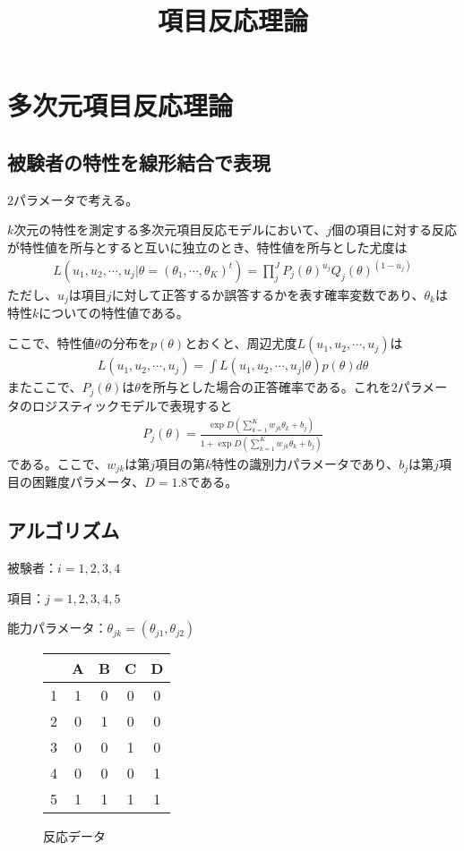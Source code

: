 \documentclass[20pt]{jarticle}
\title{項目反応理論}
\begin{document}
\maketitle
\section{多次元項目反応理論}
\subsection{被験者の特性を線形結合で表現}
$2$パラメータで考える。

$k$次元の特性を測定する多次元項目反応モデルにおいて、$j$個の項目に対する反応が特性値を所与とすると互いに独立のとき、特性値を所与とした尤度は
\begin{align}
  \label{01}
  \displaystyle
    L(u_1,u_2,\cdots,u_j|\theta = (\theta_1,\cdots,\theta_K)^{t})=\prod_j^J P_j(\theta)^{u_j} Q_j(\theta)^{(1 - u_j)}
  \tag{1}
\end{align}
ただし、$u_j$は項目$j$に対して正答するか誤答するかを表す確率変数であり、$\theta_k$は特性$k$についての特性値である。

ここで、特性値$\theta$の分布を$p(\theta)$とおくと、周辺尤度$L(u_1,u_2,\cdots,u_j)$は
\begin{align}
  \label{02}
  \displaystyle
    L(u_1,u_2,\cdots,u_j) = \int L(u_1,u_2,\cdots,u_j|\theta)p(\theta) d \theta
  \tag{2}
\end{align}
またここで、$P_j(\theta)$は$\theta$を所与とした場合の正答確率である。これを$2$パラメータのロジスティックモデルで表現すると
\begin{align}
  \label{03}
  \displaystyle
    P_j(\theta) = \frac{\exp D (\sum\limits_{k = 1}^{K} w_{jk} \theta_k + b_j)}{1 + \exp D (\sum\limits_{k = 1}^{K} w_{jk} \theta_k + b_j)}
  \tag{3}
\end{align}である。ここで、$w_{jk}$は第$j$項目の第$k$特性の識別力パラメータであり、$b_j$は第$j$項目の困難度パラメータ、$D=1.8$である。

\subsection{アルゴリズム}
被験者：$i = 1,2,3,4$

項目：$j = 1,2,3,4,5$

能力パラメータ：$\theta_{jk}=(\theta_{j1},\theta_{j2})$
\begin{figure}[H]
  \centering
  \begin{tabular}{|c|c|c|c|c|} \hline
     & A & B & C & D \\ \hline
    1 & 1 & 0 & 0 & 0 \\ \hline
    2 & 0 & 1 & 0 & 0 \\ \hline
    3 & 0 & 0 & 1 & 0 \\ \hline
    4 & 0 & 0 & 0 & 1 \\ \hline
    5 & 1 & 1 & 1 & 1 \\ \hline
  \end{tabular}
  \caption{反応データ}
\end{figure}
\end{document}
